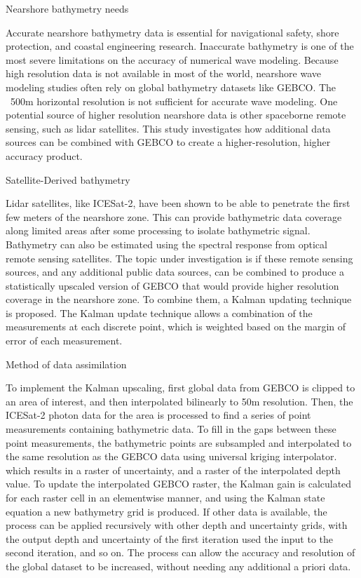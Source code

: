 Nearshore bathymetry needs 

Accurate nearshore bathymetry data is essential for navigational safety, shore protection, and coastal engineering research. Inaccurate bathymetry is one of the most severe limitations on the accuracy of numerical wave modeling. Because high resolution data is not available in most of the world, nearshore wave modeling studies often rely on global bathymetry datasets like GEBCO. The ~500m horizontal resolution is not sufficient for accurate wave modeling. One potential source of higher resolution nearshore data is other spaceborne remote sensing, such as lidar satellites. This study investigates how additional data sources can be combined with GEBCO to create a higher-resolution, higher accuracy product.

Satellite-Derived bathymetry

Lidar satellites, like ICESat-2, have been shown to be able to penetrate the first few meters of the nearshore zone. This can provide bathymetric data coverage along limited areas after some processing to isolate bathymetric signal. Bathymetry can also be estimated using the spectral response from optical remote sensing satellites. The topic under investigation is if these remote sensing sources, and any additional public data sources, can be combined to produce a statistically upscaled version of GEBCO that would provide higher resolution coverage in the nearshore zone. To combine them, a Kalman updating technique is proposed. The Kalman update technique allows a combination of the measurements at each discrete point, which is weighted based on the margin of error of each measurement.

Method of data assimilation 

To implement the Kalman upscaling, first global data from GEBCO is clipped to an area of interest, and then interpolated bilinearly to 50m resolution. Then, the ICESat-2 photon data for the area is processed to find a series of point measurements containing bathymetric data. To fill in the gaps between these point measurements, the bathymetric points are subsampled and interpolated to the same resolution as the GEBCO data using universal kriging interpolator. which results in a raster of uncertainty, and a raster of the interpolated depth value. To update the interpolated GEBCO raster, the Kalman gain is calculated for each raster cell in an elementwise manner, and using the Kalman state equation a new bathymetry grid is produced. If other data is available, the process can be applied recursively with other depth and uncertainty grids, with the output depth and uncertainty of the first iteration used the input to the second iteration, and so on. The process can allow the accuracy and resolution of the global dataset to be increased, without needing any additional a priori data.

